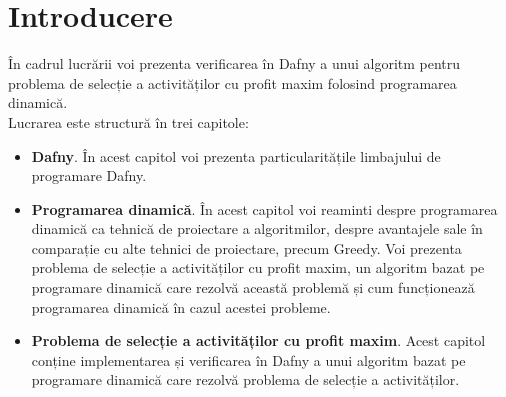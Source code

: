 \chapter*{Introducere} 

În cadrul lucrării voi prezenta verificarea în Dafny a unui algoritm pentru problema de selecție a activităților cu profit maxim folosind programarea dinamică.\\

Lucrarea este structură în trei capitole:

\begin{itemize}
  \item \textbf {Dafny}. În acest capitol voi prezenta particularitățile limbajului de programare Dafny.
  \item \textbf {Programarea dinamică}. În acest capitol voi reaminti despre programarea dinamică ca tehnică de proiectare a algoritmilor, despre avantajele sale în comparație cu alte tehnici de proiectare, precum Greedy.  Voi prezenta problema de selecție a activităților cu profit maxim, un algoritm bazat pe programare dinamică care rezolvă această problemă și cum funcționează programarea dinamică în cazul acestei probleme.  
  \item \textbf {Problema de selecție a activităților cu profit maxim}. Acest capitol conține implementarea și verificarea în Dafny a unui algoritm bazat pe programare dinamică care rezolvă problema de selecție a activităților.
\end{itemize}
